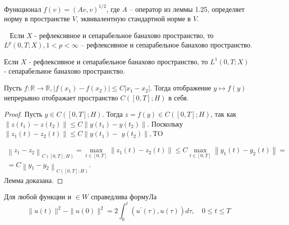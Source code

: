 \begin{lemma}
    \label{lm:1_5:27}\cite[238]{Zeidler1990a}
    Функционал $f(v)=(A v, v)^{1 / 2}$,
    где $A$ -- оператор из леммы 1.25,
    определяет норму в пространстве $V$,
    эквивалентную стандартной норме в $V$.
\end{lemma}

\begin{lemma}
    \label{lm:1_5:28}~\cite[411]{Zeidler1990a}
    Если $X$ - рефлексивное и сепарабельное банахово пространство,
    то $L^{p}(0, T ; X), 1<p<\infty$ -- рефлексивное
    и сепарабельное банахово пространство.
\end{lemma}

\begin{lemma}
    \label{lm:1_5:29}\cite[449]{Zeidler1990a}
    Если $X$ - рефлексивное и сепарабельное банахово пространство,
    то $L^{1}(0, T ; X)$ - сепарабельное банахово пространство.
\end{lemma}

\begin{lemma}
    \label{lm:1_5:30}
    Пусть $f: \mathbb{R} \rightarrow \mathbb{R},\left|f\left(x_{1}\right)
    -f\left(x_{2}\right)\right| \leq C\left|x_{1}-x_{2}\right|$.
    Тогда отображение $y \mapsto f(y)$ непрерывно
    отображает пространство $C([0, T] ; H)$ в себя.
\end{lemma}

\begin{proof}
    Пусть $y \in C([0, T] ; H)$.
    Тогда $z=f(y) \in C([0, T] ; H)$,
    так как $\left\|z\left(t_{1}\right)-z\left(t_{2}\right)\right\|
    \leq C\left\|y\left(t_{1}\right)-y\left(t_{2}\right)\right\|$.
    Поскольку $\left\|z_{1}(t)-z_{2}(t)\right\|
    \leq C \| y\left(t_{1}\right)-$ $y\left(t_{2}\right) \|, \mathrm{TO}$

    \[
        \begin{array}{r}
            \left\|z_{1}-z_{2}\right\|_{C([0, T] ; H)}=
            \max _{t \in[0, T]}\left\|z_{1}(t)
            -z_{2}(t)\right\| \leq C \max _{t \in[0, T]}\left\|y_{1}(t)
            -y_{2}(t)\right\| = \\
            =C\left\|y_{1}-y_{2}\right\|_{C([0, T] ; H)}.
        \end{array}
    \]
    Лемма доказана.
\end{proof}

\begin{lemma}
    \label{lm:1_5:31}\cite[423]{Zeidler1990a}
    Для любой функции и $\in W$ справедлива формуЛа
    \[
        \|u(t)\|^{2}-\|u(0)\|^{2}=2 \int_{0}^{t}\left(u^{\prime}(\tau),
        u(\tau)\right) d \tau, \quad 0 \leq t \leq T
    \]
\end{lemma}

